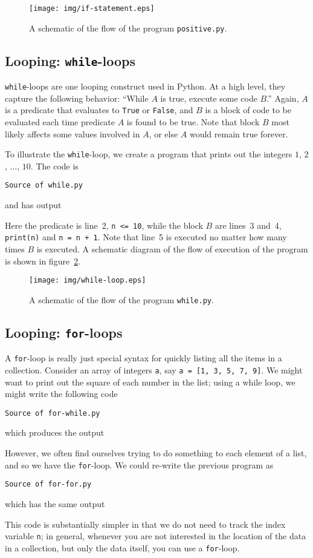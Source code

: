 \documentclass{article}
\newcommand{\example}[1]{%
  \par
  \vspace{.5em}
  \noindent \texttt{Source of #1}
  
  \vspace{.5em}
}
\newcommand{\exampleoutput}[1]{%
  \par
  \vspace{.5em}
  
  \vspace{.5em}
}
\begin{document}
\begin{figure}[htp]
  \centering
  
  \texttt{[image: img/if-statement.eps]}

  \caption{A schematic of the flow of the program
    \texttt{positive.py}.}
  \label{fig:positive}
\end{figure}

\subsection{Looping: \texttt{while}-loops}

\texttt{while}-loops are one looping construct used in Python. At a
high level, they capture the following behavior: ``While $A$ is true,
execute some code $B$.'' Again, $A$ is a predicate that evaluates to
\texttt{True} or \texttt{False}, and $B$ is a block of code to be
evaluated each time predicate $A$ is found to be true. Note that block
$B$ most likely affects some values involved in $A$, or else $A$ would
remain true forever.

To illustrate the \texttt{while}-loop, we create a program that prints
out the integers $1$, $2$, $\ldots$, $10$. The code is
\example{while.py}
and has output
\exampleoutput{while.out}
Here the predicate is line~2, \texttt{n <= 10}, while the block $B$
are lines~3 and~4, \texttt{print(n)} and \texttt{n = n + 1}. Note that
line~5 is executed no matter how many times $B$ is executed. A
schematic diagram of the flow of execution of the program is shown in figure~\ref{fig:while-loop}.

\begin{figure}[htp]
  \centering
  
  \texttt{[image: img/while-loop.eps]}

  \caption{A schematic of the flow of the program
    \texttt{while.py}.}
  \label{fig:while-loop}
\end{figure}

\subsection{Looping: \texttt{for}-loops}

A \texttt{for}-loop is really just special syntax for quickly listing
all the items in a collection. Consider an array of integers
\texttt{a}, say \texttt{a = [1, 3, 5, 7, 9]}. We might want to print
out the square of each number in the list; using a while loop, we
might write the following code
\example{for-while.py}
which produces the output
\exampleoutput{for-while.out}
However, we often find ourselves trying to do something to each
element of a list, and so we have the \texttt{for}-loop. We could
re-write the previous program as
\example{for-for.py}
which has the same output
\exampleoutput{for-for.out}
This code is substantially simpler in that we do not need to track the
index variable \texttt{n}; in general, whenever you are not interested
in the location of the data in a collection, but only the data itself,
you can use a \texttt{for}-loop.
\end{document}
